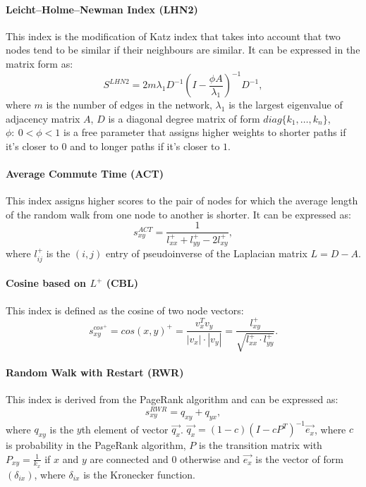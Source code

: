\documentclass{llncs}
\begin{document}
\paragraph{Leicht–Holme–Newman Index (LHN2) \cite{lhn1-index}}
%
This index is the modification of Katz index that takes into account that two nodes tend to be similar if their neighbours are similar. It can be expressed in the matrix form \cite{survey} as:
\begin{equation}
S^{LHN2} = 2 m \lambda_1 D^{-1} (I - \frac{\phi A}{\lambda_1})^{-1} D^{-1},
\end{equation}
where $m$ is the number of edges in the network, $\lambda_1$ is the largest eigenvalue of adjacency matrix $A$, $D$ is a diagonal degree matrix of form $diag\{k_1, \ldots, k_n\}$, $\phi : \ 0 < \phi < 1$ is a free parameter that assigns higher weights to shorter paths if it's closer to $0$ and to longer paths if it's closer to $1$.
%
\paragraph{Average Commute Time (ACT)}
%
This index assigns higher scores to the pair of nodes for which the average length of the random walk from one node to another is shorter. It can be expressed as:
\begin{equation}
s_{xy}^{ACT} = \frac{1}{l_{xx}^{+} + l_{yy}^{+} - 2l_{xy}^{+}},
\end{equation}
where $l_{ij}^{+}$ is the $(i, j)$ entry of pseudoinverse of the Laplacian matrix $L = D - A$.
%
\paragraph{Cosine based on $L^+$ (CBL)}
%
This index is defined as the cosine of two node vectors:
\begin{equation}
s_{xy}^{cos^{+}} = cos(x, y)^{+} = \frac{v_x^T v_y}{|v_x| \cdot |v_y|} = \frac{l_{xy}^{+}}{\sqrt{l_{xx}^{+}\cdot l_{yy}^{+}}}.
\end{equation}
%
\paragraph{Random Walk with Restart (RWR)}
%
This index is derived from the PageRank algorithm and can be expressed as:
\begin{equation}
s_{xy}^{RWR} = q_{xy} + q_{yx},
\end{equation}
where $q_{xy}$ is the $y$th element of vector $\overrightarrow{q_x}$. $\overrightarrow{q_x} = (1 - c)(I - cP^{T})^{-1} \overrightarrow{e_x}$, where $c$ is probability in the PageRank algorithm, $P$ is the transition matrix with $P_{xy} = \frac{1}{k_x}$ if $x$ and $y$ are connected and $0$ otherwise and $\overrightarrow{e_x}$ is the vector of form $(\delta_{ix})$, where $\delta_{ix}$ is the Kronecker function. 
%
\end{document}
